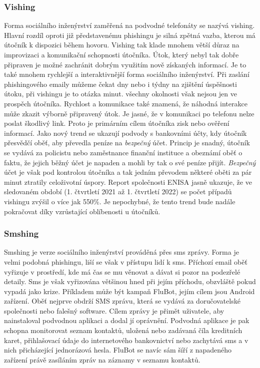 \subsubsection{Vishing}
Forma sociálního inženýrství zaměřená na podvodné telefonáty se nazývá vishing.
Hlavní rozdíl oproti již představenému phishingu je silná zpětná vazba, kterou má útočník k dispozici během hovoru.
Vishing tak klade mnohem větší důraz na improvizaci a komunikační schopnosti útočníka.
Útok, který nebyl tak dobře připraven je možné zachránit dobrým využitím nově získaných informací.
Je to také mnohem rychlejší a interaktivnější forma sociálního inženýrství.
Při zaslání phishingového emaily můžeme čekat dny nebo i týdny na zjištění úspěšnosti útoku, při vishingu je to otázka minut.
všechny okolnosti však nejsou jen ve prospěch útočníka.
Rychlost a komunikace také znamená, že náhodná interakce může zkazit výborně připravený útok.
Je jasné, že v komunikaci po telefonu nelze poslat škodlivý link.
Proto je primárním cílem útočníka zisk nebo ověření informací.
Jako nový trend se ukazují podvody s bankovními účty, kdy útočník přesvědčí oběť, aby převedla peníze na \textit{bezpečný} účet.
Princip je snadný, útočník se vydává za policistu nebo zaměstnance finanční instituce a obeznámí oběť o faktu, že jejich běžný účet je napaden a mohli by tak o své peníze přijít.
\textit{Bezpečný} účet je však pod kontrolou útočníka a tak jedním převodem některé oběti za pár minut ztratily celoživotní úspory.
Report společnosti \ac{ENISA} jasně ukazuje, že ve sledovaném období (1. čtvrtletí 2021 až 1. čtvrtletí 2022) se počet případů vishingu zvýšil o více jak 550\%.
Je nepochybné, že tento trend bude nadále pokračovat díky vzrůstající oblíbenosti u útočníků.\cite{Enisa_thread_landscape, moje_bakalarka}

\subsubsection{Smshing}
Smshing je verze sociálního inženýrství prováděná přes sms zprávy.
Forma je velmi podobná phishingu, liší se však v přístupu lidí k sms.
Příchozí email oběť vyřizuje v prostředí, kde má čas se mu věnovat a dávat si pozor na podezřelé detaily.
Sms je však vyřizována většinou hned při jejím příchodu, obzvláště pokud vypadá jako krize.
Příkladem může být kampaň FluBot, jejím cílem jsou Android zařízení.
Oběť nejprve obdrží SMS zprávu, která se vydává za doručovatelské společnosti nebo falešný software.
Cílem zprávy je přimět uživatele, aby nainstaloval podvodnou aplikaci a dodal jí oprávnění.
Podvodná aplikace je pak schopna monitorovat seznam kontaktů, uložená nebo zadávaná číla kreditních karet, přihlašovací údaje do internetového bankovnictví nebo zachytává sms a v nich přicházející jednorázová hesla.
FluBot se navíc sám šíří z napadeného zařízení právě zasíláním zpráv na záznamy v seznamu kontaktů.\cite{Enisa_thread_landscape, moje_bakalarka}

